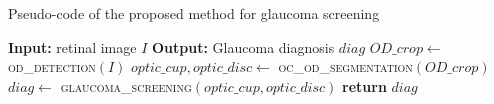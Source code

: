 \begin{algorithm}[t]
	
	\caption{Pseudo-code of the proposed method for glaucoma screening}
	\label{alg:proposedmethod}
	
	\begin{algorithmic}[1]
		
		\State \textbf{Input:} retinal image $I$ 
		\State \textbf{Output:} Glaucoma diagnosis $diag$
		\medbreak
		\State $OD\_crop \gets$ \textsc{od\_detection}$(I)$
		\State $optic\_cup, optic\_disc \gets$ \textsc{oc\_od\_segmentation}$(OD\_crop)$
		\State $diag \gets$ \textsc{glaucoma\_screening}$(optic\_cup, optic\_disc)$
		\medbreak
		\State \textbf{return} $diag$
		\EndFunction
		
	\end{algorithmic}
	
\end{algorithm}